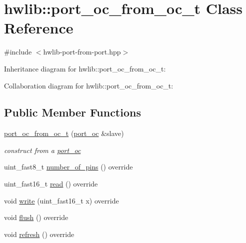\hypertarget{classhwlib_1_1port__oc__from__oc__t}{}\section{hwlib\+:\+:port\+\_\+oc\+\_\+from\+\_\+oc\+\_\+t Class Reference}
\label{classhwlib_1_1port__oc__from__oc__t}


{\ttfamily \#include $<$hwlib-\/port-\/from-\/port.\+hpp$>$}



Inheritance diagram for hwlib\+:\+:port\+\_\+oc\+\_\+from\+\_\+oc\+\_\+t\+:


Collaboration diagram for hwlib\+:\+:port\+\_\+oc\+\_\+from\+\_\+oc\+\_\+t\+:
\subsection*{Public Member Functions}
\begin{DoxyCompactItemize}
\item 
\mbox{\label{classhwlib_1_1port__oc__from__oc__t_a6fd214e22a43eea8092c4ef3212cd86e}} 
\hyperlink{classhwlib_1_1port__oc__from__oc__t_a6fd214e22a43eea8092c4ef3212cd86e}{port\+\_\+oc\+\_\+from\+\_\+oc\+\_\+t} (\hyperlink{classhwlib_1_1port__oc}{port\+\_\+oc} \&slave)
\begin{DoxyCompactList}\small\item\em construct from a \hyperlink{classhwlib_1_1port__oc}{port\+\_\+oc} \end{DoxyCompactList}\item 
uint\+\_\+fast8\+\_\+t \hyperlink{classhwlib_1_1port__oc__from__oc__t_a7836f8a9a50fb1311fb43b357cbe9310}{number\+\_\+of\+\_\+pins} () override
\item 
uint\+\_\+fast16\+\_\+t \hyperlink{classhwlib_1_1port__oc__from__oc__t_a4b5416b414d012a6b8954ae4924253d3}{read} () override
\item 
void \hyperlink{classhwlib_1_1port__oc__from__oc__t_aa3bd2d7f8e302b54a4246866d8c593b7}{write} (uint\+\_\+fast16\+\_\+t x) override
\item 
void \hyperlink{classhwlib_1_1port__oc__from__oc__t_aa6bb9eaa0ecb5305a5cbbdfe16887c07}{flush} () override
\item 
void \hyperlink{classhwlib_1_1port__oc__from__oc__t_af7012c357f07fba115da4c0486d1e1d8}{refresh} () override
\end{DoxyCompactItemize}


